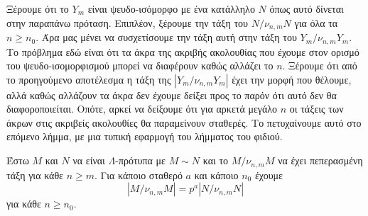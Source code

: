 \noindent Ξέρουμε ότι το $Y_m$ είναι ψευδο-ισόμορφο με ένα κατάλληλο $N$ όπως αυτό δίνεται στην παραπάνω πρόταση. Επιπλέον, ξέρουμε την τάξη του $N/\nu_{n,m}N$ για όλα τα $n\geq n_0$. Άρα μας μένει να συσχετίσουμε την τάξη αυτή στην τάξη του $Y_m/\nu_{n,m}Y_m$. Το πρόβλημα εδώ είναι ότι τα άκρα της ακριβής ακολουθίας που έχουμε στον ορισμό του ψευδο-ισομορφισμού μπορεί να διαφέρουν καθώς αλλάζει το $n$. Ξέρουμε ότι από το προηγούμενο αποτέλεσμα η τάξη της $|Y_m/\nu_{n,m}Y_m|$ έχει την μορφή που θέλουμε, αλλά καθώς αλλάζουν τα άκρα δεν έχουμε δείξει προς το παρόν ότι αυτό δεν θα διαφοροποιείται. Οπότε, αρκεί να δείξουμε ότι για αρκετά μεγάλο $n$ οι τάξεις των άκρων στις ακριβείς ακολουθίες θα παραμείνουν σταθερές. Το πετυχαίνουμε αυτό στο επόμενο λήμμα, με μια τυπική εφαρμογή του λήμματος του φιδιού.


\begin{lemma}
    Έστω $M$ και $N$ να είναι $\Lambda$-πρότυπα με $M\sim N$ και το $M/\nu_{n,m}M$ να έχει πεπερασμένη τάξη για κάθε $n\geq m$. Για κάποιο σταθερό $a$ και κάποιο $n_0$ έχουμε
    $$ |M/\nu_{n,m}M| = p^a |N/\nu_{n,m}N|$$ για κάθε $n\geq n_0$. 
\end{lemma}

